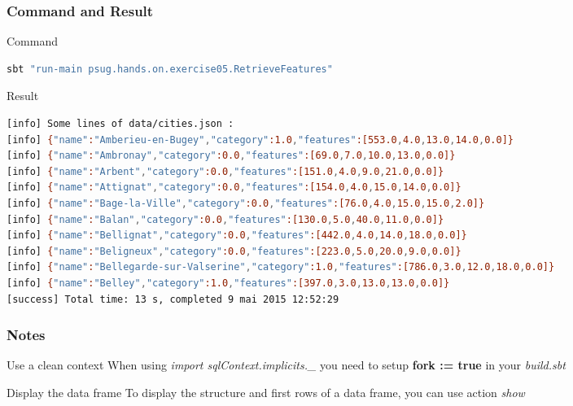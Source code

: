 \documentclass[slidetop,9pt,utf8]{beamer}
\begin{document}
\begin{CJK}{UTF8}{gbsn}
\begin{frame}
\end{frame}

\begin{frame}[fragile]
  \frametitle{Command and Result}

  \begin{block}{Command}
    \begin{lstlisting}[language=bash, style=terminal-medium]
sbt "run-main psug.hands.on.exercise05.RetrieveFeatures"
    \end{lstlisting}
  \end{block}

  \begin{block}{Result}
    \begin{lstlisting}[language=bash, style=terminal]
[info] Some lines of data/cities.json : 
[info] {"name":"Amberieu-en-Bugey","category":1.0,"features":[553.0,4.0,13.0,14.0,0.0]}
[info] {"name":"Ambronay","category":0.0,"features":[69.0,7.0,10.0,13.0,0.0]}
[info] {"name":"Arbent","category":0.0,"features":[151.0,4.0,9.0,21.0,0.0]}
[info] {"name":"Attignat","category":0.0,"features":[154.0,4.0,15.0,14.0,0.0]}
[info] {"name":"Bage-la-Ville","category":0.0,"features":[76.0,4.0,15.0,15.0,2.0]}
[info] {"name":"Balan","category":0.0,"features":[130.0,5.0,40.0,11.0,0.0]}
[info] {"name":"Bellignat","category":0.0,"features":[442.0,4.0,14.0,18.0,0.0]}
[info] {"name":"Beligneux","category":0.0,"features":[223.0,5.0,20.0,9.0,0.0]}
[info] {"name":"Bellegarde-sur-Valserine","category":1.0,"features":[786.0,3.0,12.0,18.0,0.0]}
[info] {"name":"Belley","category":1.0,"features":[397.0,3.0,13.0,13.0,0.0]}
[success] Total time: 13 s, completed 9 mai 2015 12:52:29
    \end{lstlisting}
  \end{block}

\end{frame}

\begin{frame}[fragile]
  \frametitle{Notes}

  \begin{exampleblock}{Use a clean context}
    When using \textit{import sqlContext.implicits.\_} you need to setup \textbf{fork := true} in your \textit{build.sbt}
  \end{exampleblock}

  \begin{exampleblock}{Display the data frame}
    To display the structure and first rows of a data frame, you can use action \textit{show}
  \end{exampleblock}


\end{frame}
\end{CJK}
\end{document}
